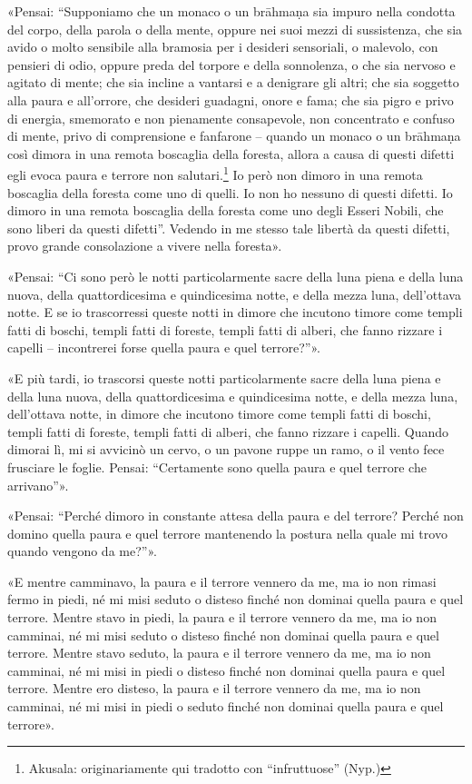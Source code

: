 «Pensai: “Supponiamo che un monaco o un brāhmaṇa sia impuro nella
condotta del corpo, della parola o della mente, oppure nei suoi mezzi di
sussistenza, che sia avido o molto sensibile alla bramosia per i
desideri sensoriali, o malevolo, con pensieri di odio, oppure preda del
torpore e della sonnolenza, o che sia nervoso e agitato di mente; che
sia incline a vantarsi e a denigrare gli altri; che sia soggetto alla
paura e all’orrore, che desideri guadagni, onore e fama; che sia pigro e
privo di energia, smemorato e non pienamente consapevole, non
concentrato e confuso di mente, privo di comprensione e fanfarone –
quando un monaco o un brāhmaṇa così dimora in una remota boscaglia della
foresta, allora a causa di questi difetti egli evoca paura e terrore non
salutari.\footnote{Akusala: originariamente qui tradotto con “infruttuose” (Nyp.)} Io però non dimoro in una remota boscaglia
della foresta come uno di quelli. Io non ho nessuno di questi difetti.
Io dimoro in una remota boscaglia della foresta come uno degli Esseri
Nobili, che sono liberi da questi difetti”. Vedendo in me stesso tale
libertà da questi difetti, provo grande consolazione a vivere nella
foresta».


«Pensai: “Ci sono però le notti particolarmente sacre della luna piena e
della luna nuova, della quattordicesima e quindicesima notte, e della
mezza luna, dell’ottava notte. E se io trascorressi queste notti in
dimore che incutono timore come templi fatti di boschi, templi fatti di
foreste, templi fatti di alberi, che fanno rizzare i capelli –
incontrerei forse quella paura e quel terrore?”».


«E più tardi, io trascorsi queste notti particolarmente sacre della luna
piena e della luna nuova, della quattordicesima e quindicesima notte, e
della mezza luna, dell’ottava notte, in dimore che incutono timore come
templi fatti di boschi, templi fatti di foreste, templi fatti di alberi,
che fanno rizzare i capelli. Quando dimorai lì, mi si avvicinò un cervo,
o un pavone ruppe un ramo, o il vento fece frusciare le foglie. Pensai:
“Certamente sono quella paura e quel terrore che arrivano”».


«Pensai: “Perché dimoro in constante attesa della paura e del terrore?
Perché non domino quella paura e quel terrore mantenendo la postura
nella quale mi trovo quando vengono da me?”».


«E mentre camminavo, la paura e il terrore vennero da me, ma io non
rimasi fermo in piedi, né mi misi seduto o disteso finché non dominai
quella paura e quel terrore. Mentre stavo in piedi, la paura e il
terrore vennero da me, ma io non camminai, né mi misi seduto o disteso
finché non dominai quella paura e quel terrore. Mentre stavo seduto, la
paura e il terrore vennero da me, ma io non camminai, né mi misi in
piedi o disteso finché non dominai quella paura e quel terrore. Mentre
ero disteso, la paura e il terrore vennero da me, ma io non camminai, né
mi misi in piedi o seduto finché non dominai quella paura e quel
terrore».


